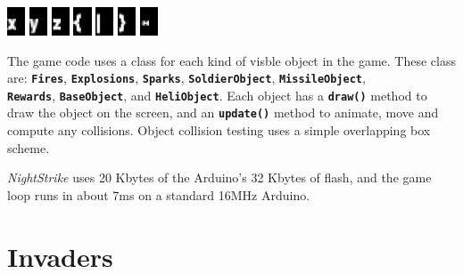 \documentclass[10pt]{book}
\newcommand{\mach}[1]{\texttt{\textbf{#1}}}
\begin{document}
\begin{CJK}{UTF8}{gkai}
\begin{center}
\includegraphics[width=0.04\textwidth]{previews/nightstrike_2-INFOFONT-88.png}
\includegraphics[width=0.04\textwidth]{previews/nightstrike_2-INFOFONT-89.png}
\includegraphics[width=0.04\textwidth]{previews/nightstrike_2-INFOFONT-90.png}
\includegraphics[width=0.04\textwidth]{previews/nightstrike_2-INFOFONT-91.png}
\includegraphics[width=0.04\textwidth]{previews/nightstrike_2-INFOFONT-92.png}
\includegraphics[width=0.04\textwidth]{previews/nightstrike_2-INFOFONT-93.png}
\includegraphics[width=0.04\textwidth]{previews/nightstrike_2-INFOFONT-94.png}
\end{center}

The game code uses a class for each kind of visble object in the game.
These class are:
\mach{Fires},
\mach{Explosions},
\mach{Sparks},
\mach{SoldierObject},
\mach{MissileObject}, \\
\mach{Rewards},
\mach{BaseObject}, and
\mach{HeliObject}.
Each object has a \mach{draw()} method to draw the object on the screen,
and an \mach{update()} method to animate, move and compute any collisions.
Object collision testing uses a simple overlapping box scheme.

\textit{NightStrike} uses 20 Kbytes of the Arduino's 32 Kbytes of flash, and
the game loop runs in about 7ms on a standard 16MHz Arduino.

\newpage
\section{Invaders}


\end{CJK}
\end{document}

